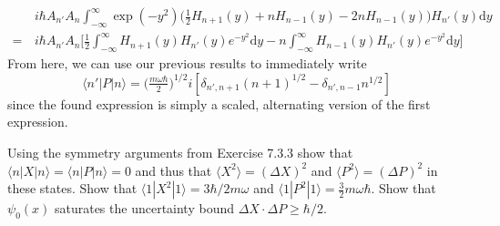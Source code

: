 \documentclass[../principles-of-quantum-mechanics.tex]{subfiles}
\begin{document}
\begin{questions}
\begin{solution}
\begin{align*}
				&i\hbar A_{n'}A_n\int_{-\infty}^{\infty}\exp(-y^2)\Big(\tfrac{1}{2}H_{n+1}(y) + nH_{n-1}(y) - 2nH_{n-1}(y)\Big)H_{n'}(y)\mathrm{d}y \\
				=\,&i\hbar A_{n'}A_n\Big[\tfrac{1}{2}\int_{-\infty}^{\infty}H_{n+1}(y)H_{n'}(y)e^{-y^2}\mathrm{d}y - n\int_{-\infty}^{\infty}H_{n-1}(y)H_{n'}(y)e^{-y^2}\mathrm{d}y\Big]
			\end{align*}
			From here, we can use our previous results to immediately write
			$$\langle n'| P|n\rangle = \big(\tfrac{m\omega\hbar}{2}\big)^{1/2}i[\delta_{n',n+1}(n+1)^{1/2} - \delta_{n',n - 1}n^{1/2}]$$
			since the found expression is simply a scaled, alternating version of the first expression.
		\end{solution}
	
		\question Using the symmetry arguments from Exercise 7.3.3 show that $\langle n|X|n\rangle = \langle n|P|n\rangle = 0$ and thus that $\langle X^2\rangle = (\Delta X)^2$ and $\langle P^2\rangle = (\Delta P)^2$ in these states. Show that $\langle 1|X^2|1\rangle = 3\hbar/2m\omega$ and $\langle 1|P^2|1\rangle = \frac{3}{2}m\omega\hbar$. Show that $\psi_0(x)$ saturates the uncertainty bound $\Delta X \cdot \Delta P \geq \hbar/2$.
		

\end{questions}
\end{document}

